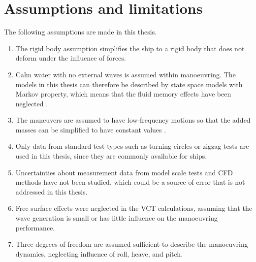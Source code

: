 \section{Assumptions and limitations}
The following assumptions are made in this thesis.
\begin{enumerate}[label=(\Roman*),itemsep=1mm]
    \item The rigid body assumption simplifies the ship to a rigid body that does not deform under the influence of forces.

    \item Calm water with no external waves is assumed within manoeuvring. The models in this thesis can therefore be described by state space models with Markov property, which means that the fluid memory effects have been neglected \cite{fossenHandbookMarineCraft2011}. 

    \item The maneuvers are assumed to have low-frequency motions so that the added masses can be simplified to have constant values \cite{fossenHandbookMarineCraft2011}.

    \item Only data from standard test types such as turning circles or zigzag tests are used in this thesis, since they are commonly available for ships. 

    \item Uncertainties about measurement data from model scale tests and CFD methods have not been studied, which could be a source of error that is not addressed in this thesis.
    
    \item Free surface effects were neglected in the VCT calculations, assuming that the wave generation is small or has little influence on the manoeuvring performance.
    
    \item Three degrees of freedom are assumed sufficient to describe the manoeuvring dynamics, neglecting influence of roll, heave, and pitch. 
        
\end{enumerate}



